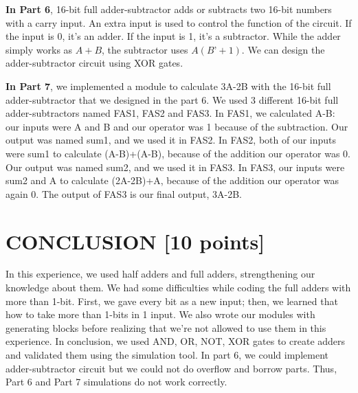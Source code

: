 \documentclass[pdftex,12pt,a4paper]{article}
\begin{document}
\textbf{In Part 6}, 16-bit full adder-subtractor adds or subtracts two 16-bit numbers with a carry input. An extra input is used to control the function of the circuit. If the input is 0, it’s an adder. If the input is 1, it’s a subtractor. While the adder simply works as \(A+B\), the subtractor uses \(A(B’+1)\). We can design the adder-subtractor circuit using XOR gates. 



\textbf{In Part 7}, we implemented a module to calculate 3A-2B with the 16-bit full adder-subtractor that we designed in the part 6. We used 3 different 16-bit full adder-subtractors named FAS1, FAS2 and FAS3. In FAS1, we calculated A-B: our inputs were A and B and our operator was 1 because of the subtraction. Our output was named sum1, and we used it in FAS2. In FAS2, both of our inputs were sum1 to calculate (A-B)+(A-B), because of the addition our operator was 0. Our output was named sum2, and we used it in FAS3. In FAS3, our inputs were sum2 and A to calculate (2A-2B)+A, because of the addition our operator was again 0. The output of FAS3 is our final output, 3A-2B. 


\section{CONCLUSION [10 points]}
In this experience, we used half adders and full adders, strengthening our knowledge about them. We had some difficulties while coding the full adders with more than 1-bit. First, we gave every bit as a new input; then, we learned that how to take more than 1-bits in 1 input. We also wrote our modules with generating blocks before realizing that we’re not allowed to use them in this experience. In conclusion, we used AND, OR, NOT, XOR gates to create adders and validated them using the simulation tool. In part 6, we could implement adder-subtractor circuit but we could not do overflow and borrow parts. Thus, Part 6 and Part 7 simulations do not work correctly.
\end{document}
